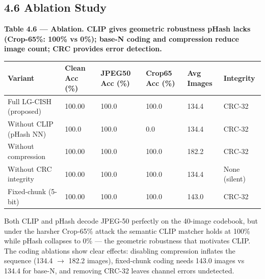 \documentclass[11pt]{article}
\begin{document}
\subsection*{4.6 Ablation Study}
\textbf{Table 4.6 --- Ablation. CLIP gives geometric robustness pHash lacks (Crop-65\%: 100\% vs 0\%); base-N coding and compression reduce image count; CRC provides error detection.}
\begin{table}[H]\centering\small
\begin{tabularx}{\textwidth}{lXXXXX}
\toprule
Variant & Clean Acc (\%) & JPEG50 Acc (\%) & Crop65 Acc (\%) & Avg Images & Integrity \\
\midrule
Full LG-CISH (proposed) & 100.00 & 100.0 & 100.0 & 134.4 & CRC-32 \\
Without CLIP (pHash NN) & 100.0 & 100.0 & 0.0 & 134.4 & CRC-32 \\
Without compression & 100.00 & 100.0 & 100.0 & 182.2 & CRC-32 \\
Without CRC integrity & 100.00 & 100.0 & 100.0 & 134.4 & None (silent) \\
Fixed-chunk (5-bit) & 100.00 & 100.0 & 100.0 & 143.0 & CRC-32 \\
\bottomrule
\end{tabularx}
\end{table}
Both CLIP and pHash decode JPEG-50 perfectly on the 40-image codebook, but under the harsher Crop-65\% attack the semantic CLIP matcher holds at 100\% while pHash collapses to 0\% --- the geometric robustness that motivates CLIP. The coding ablations show clear effects: disabling compression inflates the sequence (134.4 $\to$ 182.2 images), fixed-chunk coding needs 143.0 images vs 134.4 for base-N, and removing CRC-32 leaves channel errors undetected.
\end{document}
